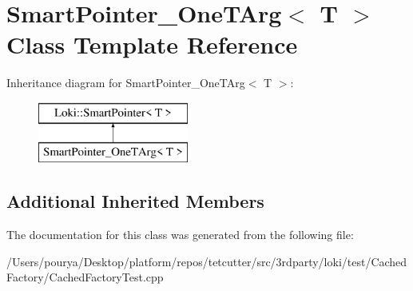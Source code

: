 \hypertarget{classSmartPointer__OneTArg}{}\section{Smart\+Pointer\+\_\+\+One\+T\+Arg$<$ T $>$ Class Template Reference}
\label{classSmartPointer__OneTArg}
Inheritance diagram for Smart\+Pointer\+\_\+\+One\+T\+Arg$<$ T $>$\+:\begin{figure}[H]
\begin{center}
\leavevmode
\includegraphics[height=2.000000cm]{classSmartPointer__OneTArg}
\end{center}
\end{figure}
\subsection*{Additional Inherited Members}


The documentation for this class was generated from the following file\+:\begin{DoxyCompactItemize}
\item 
/\+Users/pourya/\+Desktop/platform/repos/tetcutter/src/3rdparty/loki/test/\+Cached\+Factory/Cached\+Factory\+Test.\+cpp\end{DoxyCompactItemize}
